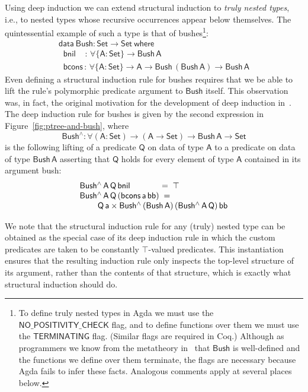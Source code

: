 \documentclass[sigplan,10pt,anonymous,review]{acmart}
\begin{document}
Using deep induction we can extend structural induction to {\em truly
  nested types}, i.e., to nested types whose recursive occurrences
appear below themselves. The quintessential example of such a type is
that of bushes\footnote{To define truly nested types in Agda we must
  use the $\mathsf{NO\_POSITIVITY\_CHECK}$ flag, and to define
  functions over them we must use the $\mathsf{TERMINATING}$ flag.
  (Similar flags are required in Coq.) Although as programmers we know
  from the metatheory in~\cite{jp19} that $\mathsf{Bush}$ is
  well-defined and the functions we define over them terminate, the
  flags are necessary because Agda fails to infer these
  facts. Analogous comments apply at several places
  below.}\cite{bm98}:
\begin{equation*}\label{eq:bush}
\begin{array}{l}
\mathsf{data\ Bush : Set \to Set\ where}\\
\mathsf{\;\;bnil\,\,\,\,\,\; :\, \forall \{A : Set\} \to Bush\,A}\\
\mathsf{\;\;bcons\, :\, \forall \{A : Set\} \to A \to Bush\,(Bush\,A) \to Bush\,A} 
\end{array}
\end{equation*}
Even defining a structural induction rule for bushes requires that we
be able to lift the rule's polymorphic predicate argument to
$\mathsf{Bush}$ itself. This observation was, in fact, the original
motivation for the development of deep induction in~\cite{jp20}. The
deep induction rule for bushes is given by the second expression in
Figure~\ref{fig:ptree-and-bush}, where
\[\mathsf{Bush^{\wedge} :
  \forall (A : Set) \to (A \to Set) \to Bush\,A \to Set}\]
is the following lifting of a predicate $\mathsf{Q}$ on data of type
$\mathsf{A}$ to a predicate on data of type $\mathsf{Bush\,A}$
asserting that $\mathsf{Q}$ holds for every element of type
$\mathsf{A}$ contained in its argument bush:
\begin{equation}
\begin{array}{l}
\mathsf{Bush^{\wedge}\,A\,Q\,bnil} \hspace*{0.49in} = \; \mathsf{\top} \\
\mathsf{Bush^{\wedge}\,A\,Q\,(bcons\,a\,bb)} \; = \;\\
\hspace*{0.3in}\mathsf{Q\,a \times Bush^{\wedge}\,(Bush\,A)\,(Bush^{\wedge}\,A\,Q)\,bb} 
\end{array}
\end{equation}

We note that the structural induction rule for any (truly) nested type
can be obtained as the special case of its deep induction rule in
which the custom predicates are taken to be constantly
$\mathsf{\top}$-valued predicates. This instantiation ensures that
the resulting induction rule only inspects the top-level structure of
its argument, rather than the contents of that structure, which is
exactly what structural induction should do.
\end{document}
